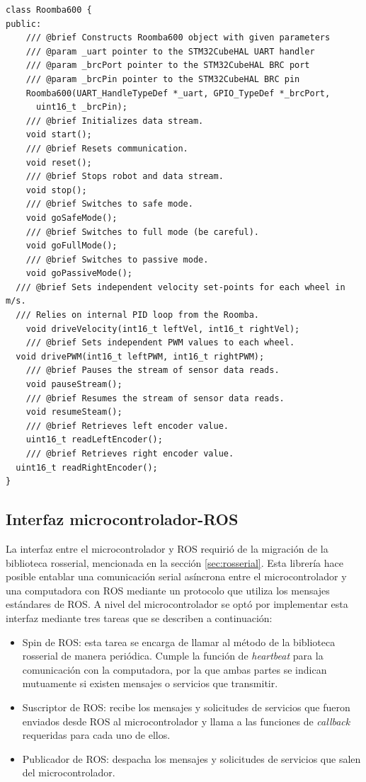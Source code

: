 \begin{lstlisting}[label=cod:Roomba600,caption=Interfaz de la clase Roomba600 que implementa el protocolo Open Interface.\protect\footnotemark]
class Roomba600 {
public:
	/// @brief Constructs Roomba600 object with given parameters
	/// @param _uart pointer to the STM32CubeHAL UART handler
	/// @param _brcPort pointer to the STM32CubeHAL BRC port
	/// @param _brcPin pointer to the STM32CubeHAL BRC pin
	Roomba600(UART_HandleTypeDef *_uart, GPIO_TypeDef *_brcPort,
      uint16_t _brcPin);
	/// @brief Initializes data stream.
	void start();
	/// @brief Resets communication.
	void reset();
	/// @brief Stops robot and data stream.
	void stop();
	/// @brief Switches to safe mode.
	void goSafeMode();
	/// @brief Switches to full mode (be careful).
	void goFullMode();
	/// @brief Switches to passive mode.
	void goPassiveMode();
  /// @brief Sets independent velocity set-points for each wheel in m/s.
  /// Relies on internal PID loop from the Roomba.
	void driveVelocity(int16_t leftVel, int16_t rightVel);
	/// @brief Sets independent PWM values to each wheel.
  void drivePWM(int16_t leftPWM, int16_t rightPWM);
	/// @brief Pauses the stream of sensor data reads.
	void pauseStream();
	/// @brief Resumes the stream of sensor data reads.
	void resumeSteam();
	/// @brief Retrieves left encoder value.
	uint16_t readLeftEncoder();
	/// @brief Retrieves right encoder value.
  uint16_t readRightEncoder();
}
\end{lstlisting}


\subsection{Interfaz microcontrolador-ROS}

La interfaz entre el microcontrolador y ROS requirió de la migración de la biblioteca rosserial, mencionada en la sección \ref{sec:rosserial}. Esta librería hace posible entablar una comunicación serial asíncrona entre el microcontrolador y una computadora con ROS mediante un protocolo que utiliza los mensajes estándares de ROS. A nivel del microcontrolador se optó por implementar esta interfaz mediante tres tareas que se describen a continuación:

\begin{itemize}
  \item Spin de ROS: esta tarea se encarga de llamar al método  de la biblioteca rosserial de manera periódica. Cumple la función de \textit{heartbeat} para la comunicación con la computadora, por la que ambas partes se indican mutuamente si existen mensajes o servicios que transmitir.
  \item Suscriptor de ROS: recibe los mensajes y solicitudes de servicios que fueron enviados desde ROS al microcontrolador y llama a las funciones de \textit{callback} requeridas para cada uno de ellos.
  \item Publicador de ROS: despacha los mensajes y solicitudes de servicios que salen del microcontrolador.
\end{itemize}

